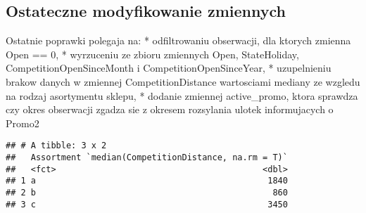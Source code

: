\documentclass[]{article}
\newenvironment{Shaded}{\begin{snugshade}}{\end{snugshade}}
\newcommand{\DataTypeTok}[1]{\textcolor[rgb]{0.13,0.29,0.53}{#1}}
\newcommand{\DecValTok}[1]{\textcolor[rgb]{0.00,0.00,0.81}{#1}}
\newcommand{\KeywordTok}[1]{\textcolor[rgb]{0.13,0.29,0.53}{\textbf{#1}}}
\newcommand{\NormalTok}[1]{#1}
\newcommand{\OperatorTok}[1]{\textcolor[rgb]{0.81,0.36,0.00}{\textbf{#1}}}
\newcommand{\StringTok}[1]{\textcolor[rgb]{0.31,0.60,0.02}{#1}}
\begin{document}
\hypertarget{ostateczne-modyfikowanie-zmiennych}{%
\subsection{Ostateczne modyfikowanie
zmiennych}\label{ostateczne-modyfikowanie-zmiennych}}

Ostatnie poprawki polegaja na: * odfiltrowaniu obserwacji, dla ktorych
zmienna Open == 0, * wyrzuceniu ze zbioru zmiennych Open, StateHoliday,
CompetitionOpenSinceMonth i CompetitionOpenSinceYear, * uzupelnieniu
brakow danych w zmiennej CompetitionDistance wartosciami mediany ze
wzgledu na rodzaj asortymentu sklepu, * dodanie zmiennej active\_promo,
ktora sprawdza czy okres obserwacji zgadza sie z okresem rozsylania
ulotek informujacych o Promo2

\begin{Shaded}
\end{Shaded}

\begin{verbatim}
## # A tibble: 3 x 2
##   Assortment `median(CompetitionDistance, na.rm = T)`
##   <fct>                                         <dbl>
## 1 a                                              1840
## 2 b                                               860
## 3 c                                              3450
\end{verbatim}
\end{document}
